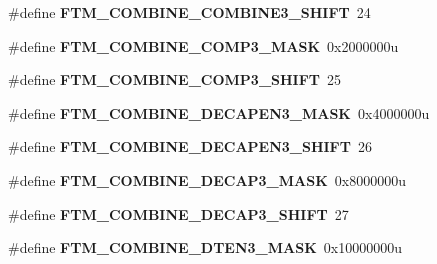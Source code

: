 \begin{DoxyCompactItemize}
\item 
\#define {\bfseries F\+T\+M\+\_\+\+C\+O\+M\+B\+I\+N\+E\+\_\+\+C\+O\+M\+B\+I\+N\+E3\+\_\+\+S\+H\+I\+FT}~24\hypertarget{group__FTM__Register__Masks_gac4d1e467f5f7a75c3c0f9f84819580e2}{}\label{group__FTM__Register__Masks_gac4d1e467f5f7a75c3c0f9f84819580e2}

\item 
\#define {\bfseries F\+T\+M\+\_\+\+C\+O\+M\+B\+I\+N\+E\+\_\+\+C\+O\+M\+P3\+\_\+\+M\+A\+SK}~0x2000000u\hypertarget{group__FTM__Register__Masks_gac7ae22ebae3b9dafb28376801cac4f9d}{}\label{group__FTM__Register__Masks_gac7ae22ebae3b9dafb28376801cac4f9d}

\item 
\#define {\bfseries F\+T\+M\+\_\+\+C\+O\+M\+B\+I\+N\+E\+\_\+\+C\+O\+M\+P3\+\_\+\+S\+H\+I\+FT}~25\hypertarget{group__FTM__Register__Masks_ga7ed13b0798dd080009e0e0843bab210f}{}\label{group__FTM__Register__Masks_ga7ed13b0798dd080009e0e0843bab210f}

\item 
\#define {\bfseries F\+T\+M\+\_\+\+C\+O\+M\+B\+I\+N\+E\+\_\+\+D\+E\+C\+A\+P\+E\+N3\+\_\+\+M\+A\+SK}~0x4000000u\hypertarget{group__FTM__Register__Masks_ga86ff21306cbdb626b711080b76d0366e}{}\label{group__FTM__Register__Masks_ga86ff21306cbdb626b711080b76d0366e}

\item 
\#define {\bfseries F\+T\+M\+\_\+\+C\+O\+M\+B\+I\+N\+E\+\_\+\+D\+E\+C\+A\+P\+E\+N3\+\_\+\+S\+H\+I\+FT}~26\hypertarget{group__FTM__Register__Masks_ga4e05420ade8e9776e65f1b2f054465a5}{}\label{group__FTM__Register__Masks_ga4e05420ade8e9776e65f1b2f054465a5}

\item 
\#define {\bfseries F\+T\+M\+\_\+\+C\+O\+M\+B\+I\+N\+E\+\_\+\+D\+E\+C\+A\+P3\+\_\+\+M\+A\+SK}~0x8000000u\hypertarget{group__FTM__Register__Masks_ga9eed3afcff66166330a8ec14590a1808}{}\label{group__FTM__Register__Masks_ga9eed3afcff66166330a8ec14590a1808}

\item 
\#define {\bfseries F\+T\+M\+\_\+\+C\+O\+M\+B\+I\+N\+E\+\_\+\+D\+E\+C\+A\+P3\+\_\+\+S\+H\+I\+FT}~27\hypertarget{group__FTM__Register__Masks_ga691e558585a939559f4588bea64c099d}{}\label{group__FTM__Register__Masks_ga691e558585a939559f4588bea64c099d}

\item 
\#define {\bfseries F\+T\+M\+\_\+\+C\+O\+M\+B\+I\+N\+E\+\_\+\+D\+T\+E\+N3\+\_\+\+M\+A\+SK}~0x10000000u\hypertarget{group__FTM__Register__Masks_ga53beef0d6bd400f7d10dff07a8e95802}{}\label{group__FTM__Register__Masks_ga53beef0d6bd400f7d10dff07a8e95802}


\end{DoxyCompactItemize}
